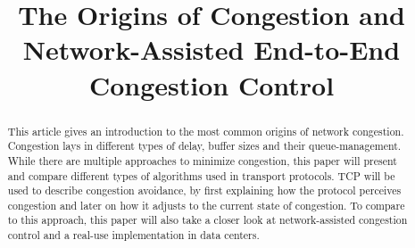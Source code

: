 \documentclass[a4paper,conference]{IEEEtran}
\begin{document}
\title{The Origins of Congestion and\\Network-Assisted End-to-End Congestion Control}


\author{
}


\maketitle
\IEEEpeerreviewmaketitle

\begin{abstract}
This article gives an introduction to the most common origins of network congestion. Congestion lays in different types of delay, buffer sizes and their queue-management. While there are multiple approaches to minimize congestion, this paper will present and compare different types of algorithms used in transport protocols. TCP will be used to describe congestion avoidance, by first explaining how the protocol perceives congestion and later on how it adjusts to the current state of congestion. To compare to this approach, this paper will also take a closer look at network-assisted congestion control and a real-use implementation in data centers.
\end{abstract}
\end{document}
